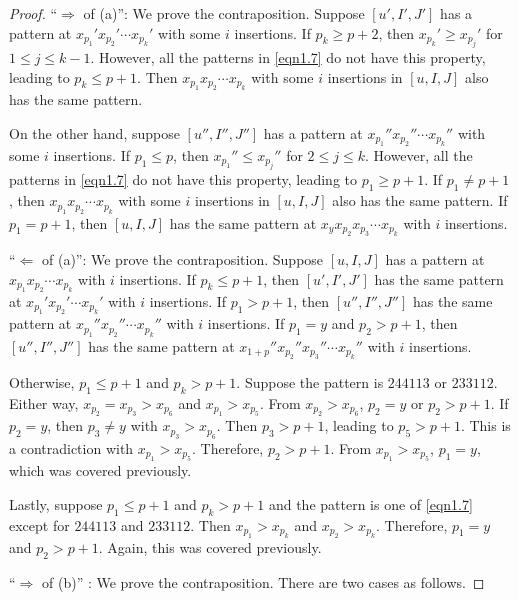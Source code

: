 \documentclass[12pt]{amsart}
\theoremstyle{definition}
\theoremstyle{remark}
\begin{document}
\begin{proof}
``$\Rightarrow$ of (a)'':  We prove the contraposition. Suppose $[u',I',J']$ has a pattern at $x_{p_1}' x_{p_2}' \cdots x_{p_k}'$ with some $i$ insertions. If $p_k \geq p+2$, then $x_{p_k}' \geq x_{p_j}'$ for $1 \leq j \leq k-1$. However, all the patterns in \eqref{eqn1.7} do not have this property, leading to $p_k \leq p+1$. Then $x_{p_1} x_{p_2} \cdots x_{p_k}$ with some $i$ insertions in $[u,I,J]$ also has the same pattern.

On the other hand, suppose $[u'',I'',J'']$ has a pattern at $x_{p_1}'' x_{p_2}'' \cdots x_{p_k}''$ with some $i$ insertions. If $p_1 \leq p$, then $x_{p_1}'' \leq x_{p_j}''$ for $2 \leq j \leq k$. However, all the patterns in \eqref{eqn1.7} do not have this property, leading to $p_1 \geq p+1$. If $p_1 \neq p+1$, then $x_{p_1} x_{p_2} \cdots x_{p_k}$ with some $i$ insertions in $[u,I,J]$ also has the same pattern. If $p_1 = p+1$, then $[u,I,J]$ has the same pattern at $x_y x_{p_2}x_{p_3} \cdots x_{p_k}$ with $i$ insertions.

``$\Leftarrow$ of (a)'': We prove the contraposition. Suppose $[u,I,J]$ has a pattern at $x_{p_1} x_{p_2} \cdots x_{p_k}$ with $i$ insertions. If $p_k \leq p+1$, then $[u',I',J']$ has the same pattern at $x_{p_1}' x_{p_2}' \cdots x_{p_k}'$ with $i$ insertions. If $p_1 >p+1$, then $[u'',I'',J'']$ has the same pattern at $x_{p_1}''x_{p_2}'' \cdots x_{p_k}''$ with $i$ insertions. If $p_1 = y$ and $p_2 > p+1$, then $[u'', I'', J'']$ has the same pattern at $x_{1+p}'' x_{p_2}'' x_{p_3}'' \cdots x_{p_k}''$ with $i$ insertions.

Otherwise, $p_1 \leq p+1$ and $p_k >p+1$. Suppose the pattern is $244113$ or $233112$. Either way, $x_{p_2} = x_{p_3} > x_{p_6}$ and $x_{p_1} > x_{p_5}$. From $x_{p_2} > x_{p_6}$, $p_2 = y$ or $p_2 > p+1$. If $p_2 = y$, then $p_3 \neq y$ with $x_{p_3} > x_{p_6}$. Then $p_3 >p+1$, leading to $p_5 > p+1$. This is a contradiction with $x_{p_1} > x_{p_5}$. Therefore, $p_2 > p+1$. From $x_{p_1} > x_{p_5}$, $p_1 = y$, which was covered previously.

Lastly, suppose $p_1 \leq p+1$ and $p_k >p+1$ and the pattern is one of \eqref{eqn1.7} except for $244113$ and $233112$. Then $x_{p_1}>x_{p_k}$ and $x_{p_2} > x_{p_k}$. Therefore, $p_1 = y$ and $p_2 >p+1$. Again, this was covered previously.

``$\Rightarrow$ of (b)'' : We prove the contraposition. There are two cases as follows.


\end{proof}
\end{document}
